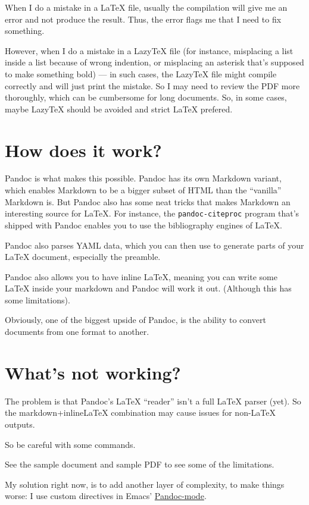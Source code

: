 \documentclass[english,]{amsart}
\begin{document}
When I do a mistake in a LaTeX file, usually the compilation will give
me an error and not produce the result. Thus, the error flags me that I
need to fix something.

However, when I do a mistake in a LazyTeX file (for instance, misplacing
a list inside a list because of wrong indention, or misplacing an
asterisk that's supposed to make something bold) --- in such cases, the
LazyTeX file might compile correctly and will just print the mistake. So
I may need to review the PDF more thoroughly, which can be cumbersome
for long documents. So, in some cases, maybe LazyTeX should be avoided
and strict LaTeX prefered.

\section{How does it work?}\label{how-does-it-work}

Pandoc is what makes this possible. Pandoc has its own Markdown variant,
which enables Markdown to be a bigger subset of HTML than the
``vanilla'' Markdown is. But Pandoc also has some neat tricks that makes
Markdown an interesting source for LaTeX. For instance, the
\texttt{pandoc-citeproc} program that's shipped with Pandoc enables you
to use the bibliography engines of LaTeX.

Pandoc also parses YAML data, which you can then use to generate parts
of your LaTeX document, especially the preamble.

Pandoc also allows you to have inline LaTeX, meaning you can write some
LaTeX inside your markdown and Pandoc will work it out. (Although this
has some limitations).

Obviously, one of the biggest upside of Pandoc, is the ability to
convert documents from one format to another.

\section{What's not working?}\label{whats-not-working}

The problem is that Pandoc's LaTeX ``reader'' isn't a full LaTeX parser
(yet). So the markdown+inlineLaTeX combination may cause issues for
non-LaTeX outputs.

So be careful with some commands.

See the sample document and sample PDF to see some of the limitations.

My solution right now, is to add another layer of complexity, to make
things worse: I use custom directives in Emacs'
\href{http://joostkremers.github.io/pandoc-mode/}{Pandoc-mode}.
\end{document}

